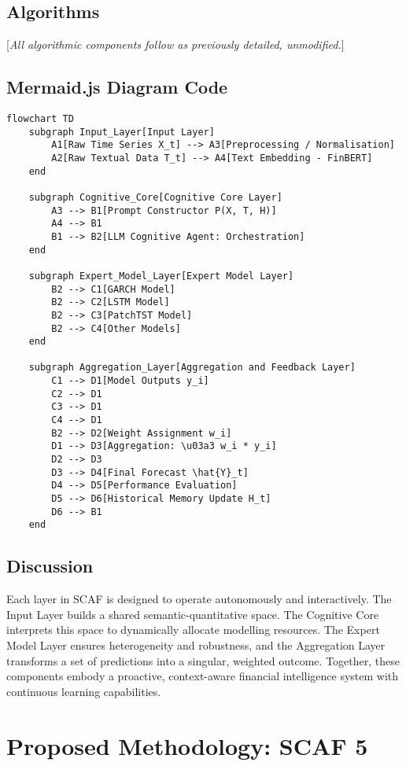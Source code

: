 \documentclass[conference]{IEEEtran}
\begin{document}
\subsection{Algorithms}
[\emph{All algorithmic components follow as previously detailed, unmodified.}]

\subsection{Mermaid.js Diagram Code}
\begin{verbatim}
flowchart TD
    subgraph Input_Layer[Input Layer]
        A1[Raw Time Series X_t] --> A3[Preprocessing / Normalisation]
        A2[Raw Textual Data T_t] --> A4[Text Embedding - FinBERT]
    end

    subgraph Cognitive_Core[Cognitive Core Layer]
        A3 --> B1[Prompt Constructor P(X, T, H)]
        A4 --> B1
        B1 --> B2[LLM Cognitive Agent: Orchestration]
    end

    subgraph Expert_Model_Layer[Expert Model Layer]
        B2 --> C1[GARCH Model]
        B2 --> C2[LSTM Model]
        B2 --> C3[PatchTST Model]
        B2 --> C4[Other Models]
    end

    subgraph Aggregation_Layer[Aggregation and Feedback Layer]
        C1 --> D1[Model Outputs y_i]
        C2 --> D1
        C3 --> D1
        C4 --> D1
        B2 --> D2[Weight Assignment w_i]
        D1 --> D3[Aggregation: \u03a3 w_i * y_i]
        D2 --> D3
        D3 --> D4[Final Forecast \hat{Y}_t]
        D4 --> D5[Performance Evaluation]
        D5 --> D6[Historical Memory Update H_t]
        D6 --> B1
    end
\end{verbatim}

\subsection{Discussion}
Each layer in SCAF is designed to operate autonomously and interactively. The Input Layer builds a shared semantic-quantitative space. The Cognitive Core interprets this space to dynamically allocate modelling resources. The Expert Model Layer ensures heterogeneity and robustness, and the Aggregation Layer transforms a set of predictions into a singular, weighted outcome. Together, these components embody a proactive, context-aware financial intelligence system with continuous learning capabilities.
\section{Proposed Methodology: SCAF 5}
\end{document}
